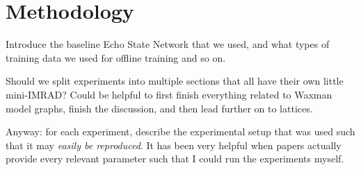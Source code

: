 \chapter{Methodology}

Introduce the baseline Echo State Network that we used, and what types of
training data we used for offline training and so on.

Should we split experiments into multiple sections that all have their own
little mini-IMRAD? Could be helpful to first finish everything related to Waxman
model graphs, finish the discussion, and then lead further on to lattices.

Anyway: for each experiment, describe the experimental setup that was used such
that it may \textit{easily be reproduced}. It has been very helpful when papers
actually provide every relevant parameter such that I could run the experiments
myself.

